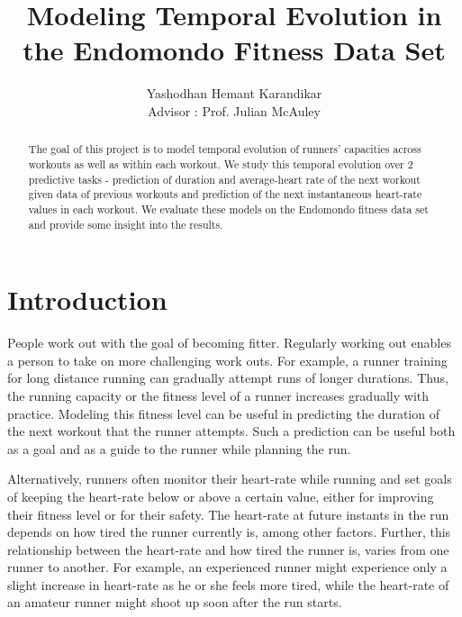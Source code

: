 \documentclass{acm_proc_article-sp}
\begin{document}
\title{Modeling Temporal Evolution in the Endomondo Fitness Data Set}
%
%
\author{
\alignauthor
Yashodhan Hemant Karandikar\\
\bigskip
       {Advisor : Prof. Julian McAuley}
}


\maketitle
\begin{abstract}
The goal of this project is to model temporal evolution of runners' capacities across workouts as well as within each workout. We study this temporal evolution over 2 predictive tasks - prediction of duration and average-heart rate of the next workout given data of previous workouts and prediction of the next instantaneous heart-rate values in each workout. We evaluate these models on the Endomondo fitness data set \cite{endomondo} and provide some insight into the results.
\end{abstract}




\section{Introduction}
People work out with the goal of becoming fitter. Regularly working out enables a person to take on more challenging work outs. For example, a runner training for long distance running can gradually attempt runs of longer durations. Thus, the running capacity or the fitness level of a runner increases gradually with practice. Modeling this fitness level can be useful in predicting the duration of the next workout that the runner attempts. Such a prediction can be useful both as a goal and as a guide to the runner while planning the run.

Alternatively, runners often monitor their heart-rate while running and set goals of keeping the heart-rate below or above a certain value, either for improving their fitness level or for their safety. The heart-rate at future instants in the run depends on how tired the runner currently is, among other factors. Further, this relationship between the heart-rate and how tired the runner is, varies from one runner to another. For example, an experienced runner might experience only a slight increase in heart-rate as he or she feels more tired, while the heart-rate of an amateur runner might shoot up soon after the run starts.
\end{document}
